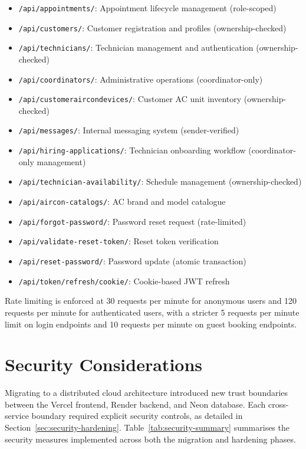 \documentclass[conference]{IEEEtran}
\begin{document}
\begin{itemize}
    \item \texttt{/api/appointments/}: Appointment lifecycle management (role-scoped)
    \item \texttt{/api/customers/}: Customer registration and profiles (ownership-checked)
    \item \texttt{/api/technicians/}: Technician management and authentication (ownership-checked)
    \item \texttt{/api/coordinators/}: Administrative operations (coordinator-only)
    \item \texttt{/api/customeraircondevices/}: Customer AC unit inventory (ownership-checked)
    \item \texttt{/api/messages/}: Internal messaging system (sender-verified)
    \item \texttt{/api/hiring-applications/}: Technician onboarding workflow (coordinator-only management)
    \item \texttt{/api/technician-availability/}: Schedule management (ownership-checked)
    \item \texttt{/api/aircon-catalogs/}: AC brand and model catalogue
    \item \texttt{/api/forgot-password/}: Password reset request (rate-limited)
    \item \texttt{/api/validate-reset-token/}: Reset token verification
    \item \texttt{/api/reset-password/}: Password update (atomic transaction)
    \item \texttt{/api/token/refresh/cookie/}: Cookie-based JWT refresh
\end{itemize}

Rate limiting is enforced at 30 requests per minute for anonymous users and 120 requests per minute for authenticated users, with a stricter 5 requests per minute limit on login endpoints and 10 requests per minute on guest booking endpoints.

\section{Security Considerations}

Migrating to a distributed cloud architecture introduced new trust boundaries between the Vercel frontend, Render backend, and Neon database. Each cross-service boundary required explicit security controls, as detailed in Section~\ref{sec:security-hardening}. Table~\ref{tab:security-summary} summarises the security measures implemented across both the migration and hardening phases.
\end{document}
